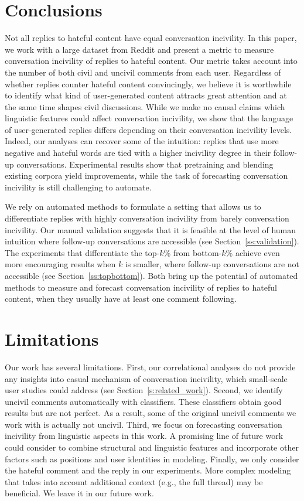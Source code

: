 \documentclass[11pt]{article}
\begin{document}
	\section{Conclusions}
	Not all replies to hateful content have equal conversation incivility.
	In this paper, we work with a large dataset from Reddit and present a metric to measure conversation incivility of replies to hateful content.
	Our metric takes account into the number of both civil and uncivil comments from each user.
	Regardless of whether replies counter hateful content convincingly,
	we believe it is worthwhile to identify what kind of user-generated content attracts great attention and at the same time shapes civil discussions.
	While we make no causal claims which linguistic features could affect conversation incivility, 
	we show that the language of user-generated replies differs depending on their conversation incivility levels.
	Indeed, our analyses can recover some of the intuition: replies that use more negative and hateful words are tied with a higher incivility degree in their follow-up conversations.
	Experimental results show that pretraining and blending existing corpora yield improvements, while the task of forecasting conversation incivility is still challenging to automate.
	
	We rely on automated methods to formulate a setting that allows us to differentiate replies with highly conversation incivility from barely conversation incivility. 
	Our manual validation suggests that it is feasible at the level of human intuition where follow-up conversations are accessible (see Section~\ref{ss:validation}).
	The experiments that differentiate the top-$k$\% from bottom-$k$\% achieve even more encouraging results when $k$ is smaller, where follow-up conversations are not accessible (see Section~\ref{ss:topbottom}).
	Both bring up the potential of automated methods to measure and forecast conversation incivility of replies to hateful content, when they usually have at least one comment following.
	
	
	
	\section*{Limitations}
	Our work has several limitations. 
	First, our correlational analyses do not provide any insights into casual mechanism of conversation incivility, which small-scale user studies could address (see Section~\ref{s:related_work}).
	Second, we identify uncivil comments automatically with classifiers.
	These classifiers obtain good results but are not perfect.
	As a result,
	some of the original uncivil comments we work with is actually not uncivil.
	Third, we focus on forecasting conversation incivility from linguistic aspects in this work. 
	A promising line of future work could consider to combine structural and linguistic features and incorporate other factors such as positions and user identities in modeling.
	Finally, we only consider the hateful comment and the reply in our experiments.
	More complex modeling that takes into account additional context (e.g., the full thread) may be beneficial.
	We leave it in our future work.
	
\end{document}
